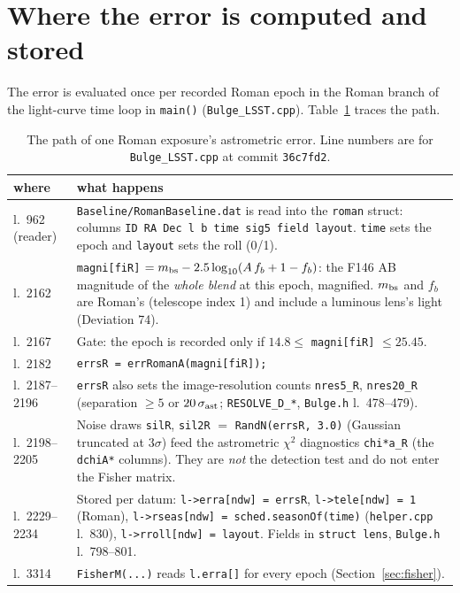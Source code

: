 \documentclass[english,10pt,a4paper]{article}
\newcommand{\code}[1]{\texttt{#1}}
\begin{document}
\section{Where the error is computed and stored}
\label{sec:flow}

The error is evaluated once per recorded Roman epoch in the Roman branch of the light-curve time
loop in \code{main()} (\code{Bulge\_LSST.cpp}). Table~\ref{tab:flow} traces the path.

\begin{table}[h]
\centering
\caption{The path of one Roman exposure's astrometric error. Line numbers are for
\code{Bulge\_LSST.cpp} at commit \code{36c7fd2}.}
\label{tab:flow}
\small
\begin{tabularx}{\textwidth}{@{}l X@{}}
\toprule
where & what happens \\
\midrule
l.~962 (reader) & \code{Baseline/RomanBaseline.dat} is read into the \code{roman} struct: columns \code{ID RA Dec l b time sig5 field layout}. \code{time} sets the epoch and \code{layout} sets the roll (0/1). \\
l.~2162 & \code{magni[fiR]} $= m_{\rm bs} - 2.5\log_{10}(A\,f_b + 1 - f_b)$: the F146 AB magnitude of the \emph{whole blend} at this epoch, magnified. $m_{\rm bs}$ and $f_b$ are Roman's (telescope index 1) and include a luminous lens's light (Deviation 74). \\
l.~2167 & Gate: the epoch is recorded only if $14.8 \le$ \code{magni[fiR]} $\le 25.45$. \\
l.~2182 & \code{errsR = errRomanA(magni[fiR]);} \\
l.~2187--2196 & \code{errsR} also sets the image-resolution counts \code{nres5\_R}, \code{nres20\_R} (separation $\ge 5$ or $20\,\sigma_{\rm ast}$; \code{RESOLVE\_D\_*}, \code{Bulge.h} l.~478--479). \\
l.~2198--2205 & Noise draws \code{silR}, \code{sil2R} $=$ \code{RandN(errsR, 3.0)} (Gaussian truncated at $3\sigma$) feed the astrometric $\chi^2$ diagnostics \code{chi*a\_R} (the \code{dchiA*} columns). They are \emph{not} the detection test and do not enter the Fisher matrix. \\
l.~2229--2234 & Stored per datum: \code{l->erra[ndw] = errsR}, \code{l->tele[ndw] = 1} (Roman), \code{l->rseas[ndw] = sched.seasonOf(time)} (\code{helper.cpp} l.~830), \code{l->rroll[ndw] = layout}. Fields in \code{struct lens}, \code{Bulge.h} l.~798--801. \\
l.~3314 & \code{FisherM(...)} reads \code{l.erra[]} for every epoch (Section~\ref{sec:fisher}). \\
\bottomrule
\end{tabularx}
\end{table}
\end{document}
